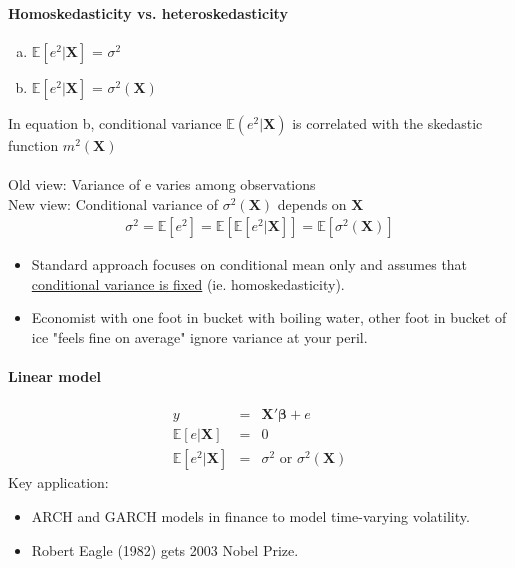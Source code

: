 \paragraph{Homoskedasticity vs. heteroskedasticity}
\begin{enumerate}[(a)]
\item $\mathbb{E}[e^{2}|\boldsymbol{X}]$ = $\sigma^{2}$
\item $\mathbb{E}[e^{2}|\boldsymbol{X}]$ = $\sigma^{2}(\boldsymbol{X})$
\end{enumerate}
\noindent In equation b, conditional variance $\mathbb{E}(e^{2}|\boldsymbol{X})$ is correlated with the skedastic function $m^{2}(\boldsymbol{X})$\\
\\
Old view: Variance of e varies among observations\\
New view: Conditional variance of $\sigma^{2}(\boldsymbol{X})$ depends on $\boldsymbol{X}$
\begin{eqnarray*}
\sigma^{2}=\mathbb{E}[e^{2}]=\mathbb{E}[\mathbb{E}[e^{2}|\boldsymbol{X}]]=\mathbb{E}[\sigma^{2}(\boldsymbol{X})]
\end{eqnarray*}
\begin{itemize}
\item Standard approach focuses on conditional mean only and assumes that \underline{conditional variance is fixed} (ie. homoskedasticity).
\item Economist with one foot in bucket with boiling water, other foot in bucket of ice "feels fine on average" ignore variance at your peril.
\end{itemize}

\paragraph{Linear model}
\begin{eqnarray*}
y&=&\boldsymbol{X'\beta}+e\\
\mathbb{E}[e|\boldsymbol{X}]&=& 0\\
\mathbb{E}[e^{2}|\boldsymbol{X}]&=& \sigma^{2} \text{ or } \sigma^{2}(\boldsymbol{X})
\end{eqnarray*}
Key application: 
\begin{itemize}
\item ARCH and GARCH models in finance to model time-varying volatility.
\item Robert Eagle (1982) gets 2003 Nobel Prize.
\end{itemize}

